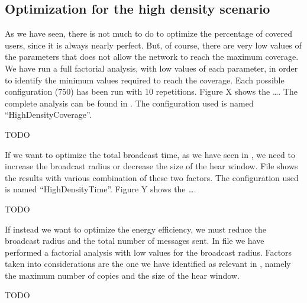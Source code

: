 \subsection{Optimization for the high density
scenario}\label{subsec:hdoptimization}

As we have seen, there is not much to do to optimize the percentage of covered
users, since it is always nearly perfect. But, of course, there are very low
values of the parameters that does not allow the network to reach the maximum
coverage. We have run a full factorial analysis, with low values of each
parameter, in order to identify the minimum values required to reach the
coverage. Each possible configuration (\(750\)) has been run with 10
repetitions. Figure X shows the \ldots. The complete analysis can be found in
. The configuration used is named
``HighDensityCoverage''.

TODO

If we want to optimize the total broadcast time, as we have seen in
, we need to increase the broadcast radius or decrease the
size of the hear window. File  shows the results with
various combination of these two factors. The configuration used is named
``HighDensityTime''. Figure Y shows the \ldots.

TODO

If instead we want to optimize the energy efficiency, we must reduce the
broadcast radius and the total number of messages sent. In file
 we have performed a factorial analysis with low values for
the broadcast radius. Factors taken into considerations are the one we have
identified as relevant in , namely the maximum number of
copies and the size of the hear window.

TODO
